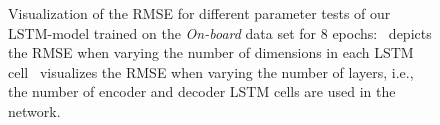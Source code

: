 \begin{figure}[t!]
	\centering
    \vspace{-0.3cm}
    \caption{Visualization of the \ac{RMSE} for different parameter tests of our \ac{LSTM}-model trained on the \emph{On-board} data set for \num{8} epochs:~\protect{} depicts the \ac{RMSE} when varying the number of dimensions in each \ac{LSTM} cell~\protect{} visualizes the \ac{RMSE} when varying the number of layers, i.e., the number of encoder and decoder \ac{LSTM} cells are used in the network.}
    \label{fig:lstm_units_layers_analysis}
\end{figure}


